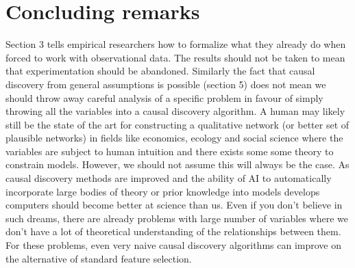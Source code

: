 \documentclass[11pt,a4paper]{article}
\begin{document}
\section{Concluding remarks}

Section 3 tells empirical researchers how to formalize what they already do when forced to work with observational data. The results should not be taken to mean that experimentation should be abandoned. Similarly the fact that causal discovery from general assumptions is possible (section 5) does not mean we should throw away careful analysis of a specific problem in favour of simply throwing all the variables into a causal discovery algorithm. A human may likely still be the state of the art for constructing a qualitative network (or better set of plausible networks) in fields like economics, ecology and social science where the variables are subject to human intuition and there exists some some theory to constrain models. However, we should not assume this will always be the case. As causal discovery methods are improved and the ability of AI to automatically incorporate large bodies of theory or prior knowledge into models develops computers should become better at science than us. Even if you don't believe in such dreams, there are already problems with large number of variables where we don't have a lot of theoretical understanding of the relationships between them. For these problems, even very naive causal discovery algorithms can improve on the alternative of standard feature selection.

\end{document}
